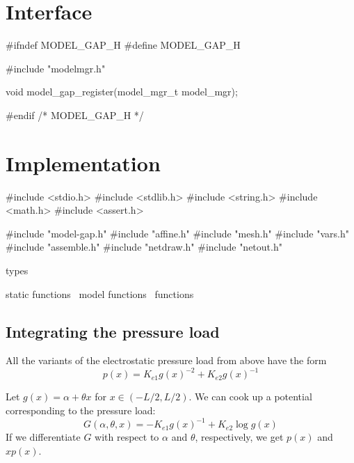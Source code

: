 \section{Interface}

\endmoddef
#ifndef MODEL_GAP_H
#define MODEL_GAP_H

#include "modelmgr.h"

void model_gap_register(model_mgr_t model_mgr);

#endif /* MODEL_GAP_H */
\nwendcode{}\nwdocspar



\section{Implementation}

\nwenddocs{}\endmoddef
#include <stdio.h>
#include <stdlib.h>
#include <string.h>
#include <math.h>
#include <assert.h>

#include "model-gap.h"
#include "affine.h"
#include "mesh.h"
#include "vars.h"
#include "assemble.h"
#include "netdraw.h"
#include "netout.h"

\LA{}types~{\nwtagstyle{}}\RA{}

\LA{}static functions~{\nwtagstyle{}}\RA{}
\LA{}model functions~{\nwtagstyle{}}\RA{}
\LA{}functions~{\nwtagstyle{}}\RA{}
\nwendcode{}\nwdocspar


\subsection{Integrating the pressure load}

All the variants of the electrostatic pressure load from above have
the form
\[
  p(x) = K_{e1} g(x)^{-2} + K_{e2} g(x)^{-1}
\]

Let $g(x) = \alpha + \theta x$ for $x \in (-L/2, L/2)$.
We can cook up a potential corresponding to the pressure load:
\[
  G(\alpha, \theta, x) = -K_{e1} g(x)^{-1} + K_{e2} \log g(x)
\]
If we differentiate $G$ with respect to $\alpha$ and $\theta$,
respectively, we get $p(x)$ and $x p(x)$.

